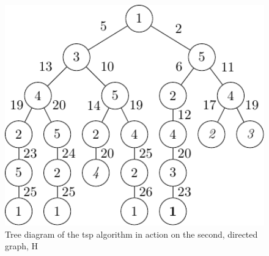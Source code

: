 \begin{figure}
\centering
\includegraphics[keepaspectratio,width=1.0\textwidth,height=0.35\textheight]{chapters/tsp/figs/ugraph-figure3}
\caption[Tree diagram of the  algorithm's operation on a directed graph]{\label{fig:tsp:dtree}Tree diagram of the \gls{tsp} algorithm in action on the second, directed graph, H}
\end{figure}

\begin{cpobjectsfloat}
\begin{cpobjects}
\end{cpobjects}
    \caption[Set of subcells from H in the skin membrane at the initial state]{\label{objs:tsp:obj1d}Set of subcells from H in the skin membrane at the initial state (those different from G are in bold)}
\end{cpobjectsfloat}

